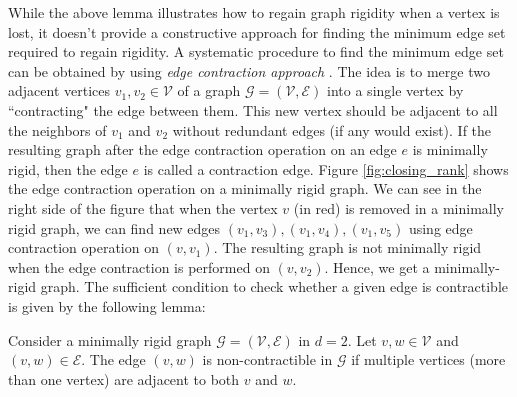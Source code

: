 While the above lemma illustrates how to regain graph rigidity when a vertex is lost, it doesn't provide a constructive approach for finding the minimum edge set required to regain rigidity. A systematic procedure to find the minimum edge set can be obtained by using \textit{edge contraction approach} \cite{fidan2010closing}. The idea is to merge two adjacent vertices $v_1,v_2 \in \mathcal{V}$ of a graph $\mathcal{G} = (\mathcal{V}, \mathcal{E})$ into a single vertex by ``contracting" the edge between them. This new vertex should be adjacent to all the neighbors of $v_1$ and $v_2$ without redundant edges (if any would exist). If the resulting graph after the edge contraction operation on an edge $e$ is minimally rigid, then the edge $e$ is called a contraction edge. Figure \ref{fig:closing_rank} shows the edge contraction operation on a minimally rigid graph. We can see in the right side of the figure that when the vertex $v$ (in red) is removed in a minimally rigid graph, we can find new edges $(v_1,v_3), (v_1, v_4), (v_1, v_5)$ using edge contraction operation on $(v, v_1)$. The resulting graph is not minimally rigid when the edge contraction is performed on $(v, v_2)$. Hence, we get a minimally-rigid graph. The sufficient condition to check whether a given edge is contractible \cite{fidan2010closing} is given by the following lemma:
\begin{lemma}
\label{lem:non_contract}
Consider a minimally rigid graph $\mathcal{G} = (\mathcal{V}, \mathcal{E})$ in $d=2$. Let $v,w \in \mathcal{V}$ and $(v,w) \in \mathcal{E}$. The edge $(v,w)$ is non-contractible in $\mathcal{G}$ if multiple vertices (more than one vertex) are adjacent to both $v$ and $w$.
\end{lemma}

